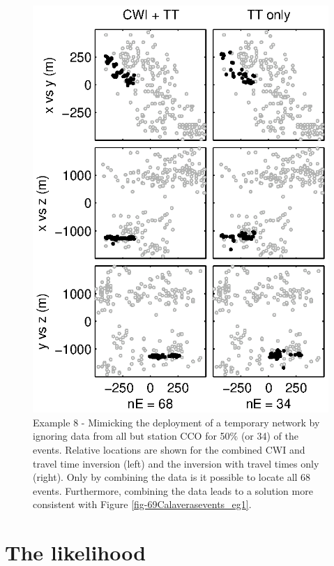 \documentclass[extra, onecolumn, doublespacing]{gji}
\begin{document}
\begin{figure}
\includegraphics{Figure13_bw.eps}
\caption{Example 8 - Mimicking the deployment of a temporary network
by ignoring data from all but station CCO for 50\% (or 34) of the
events. Relative locations are shown for the combined CWI and travel
time inversion (left) and the inversion with travel times only
(right). Only by combining the data is it possible to locate all 68
events. Furthermore, combining the data leads to a solution more
consistent with Figure \ref{fig-69Calaverasevents_eg1}. }
\label{fig-68Calaverasevents_ttsubsetandcoda1}
\end{figure}


\appendix
\clearpage

\section{The likelihood}
\label{sec-Appendix-noisylikelihood}
\end{document}

